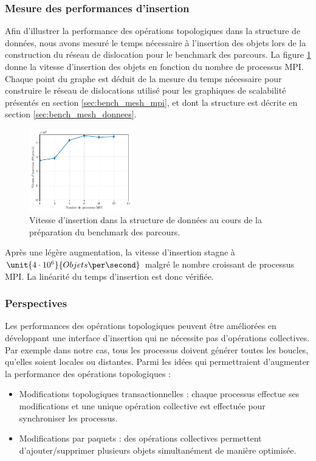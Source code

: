 \subsubsection{Mesure des performances d'insertion}

Afin d'illustrer la performance des opérations topologiques dans la structure de données, nous avons mesuré le temps nécessaire à l'insertion des objets lors de la construction du réseau de dislocation pour le benchmark des parcours. La figure \ref{fig:bench_mesh_insertion} donne la vitesse d'insertion des objets en fonction du nombre de processus MPI. Chaque point du graphe est déduit de la mesure du temps nécessaire pour construire le réseau de dislocations utilisé pour les graphiques de scalabilité présentés en section \ref{sec:bench_mesh_mpi}, et dont la structure est décrite en section \ref{sec:bench_mesh_donnees}.

\begin{figure}
	\centering
	\includegraphics[width=0.4\textwidth]{img/bench_mesh_insertion}
	\caption{Vitesse d'insertion dans la structure de données au cours de la préparation du benchmark des parcours.}
	\label{fig:bench_mesh_insertion}
\end{figure}

Après une légère augmentation, la vitesse d'insertion stagne à $\unit{4\cdot10^{6}}{Objets\per \second}$ malgré le nombre croissant de processus MPI. La linéarité du temps d'insertion est donc vérifiée.

\subsubsection{Perspectives}

Les performances des opérations topologiques peuvent être améliorées en développant une interface d'insertion qui ne nécessite pas d'opérations collectives. Par exemple dans notre cas, tous les processus doivent générer toutes les boucles, qu'elles soient locales ou distantes. Parmi les idées qui permettraient d'augmenter la performance des opérations topologiques :
\begin{itemize}
	\item Modifications topologiques transactionnelles : chaque processus effectue ses modifications et une unique opération collective est effectuée pour synchroniser les processus.
	\item Modifications par paquets : des opérations collectives permettent d'ajouter/supprimer plusieurs objets simultanément de manière optimisée. 
\end{itemize}